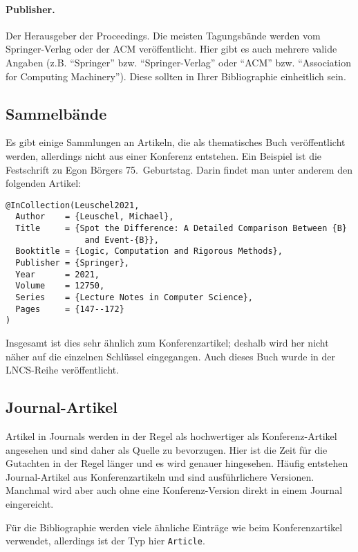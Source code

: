 \paragraph{Publisher.} Der Herausgeber der Proceedings.
Die meisten Tagungsbände werden vom Springer-Verlag oder der ACM veröffentlicht.
Hier gibt es auch mehrere valide Angaben (z.B. \enquote{Springer} bzw. \enquote{Springer-Verlag} oder \enquote{ACM} bzw. \enquote{Association for Computing Machinery}).
Diese sollten in Ihrer Bibliographie einheitlich sein.



\subsection{Sammelbände}

Es gibt einige Sammlungen an Artikeln, die als thematisches Buch veröffentlicht werden,
allerdings nicht aus einer Konferenz entstehen.
Ein Beispiel ist die Festschrift zu Egon Börgers 75.\ Geburtstag.
Darin findet man unter anderem den folgenden Artikel:

\begin{verbatim}
@InCollection(Leuschel2021,
  Author    = {Leuschel, Michael},
  Title     = {Spot the Difference: A Detailed Comparison Between {B}
                and Event-{B}},
  Booktitle = {Logic, Computation and Rigorous Methods},
  Publisher = {Springer},
  Year      = 2021,
  Volume    = 12750,
  Series    = {Lecture Notes in Computer Science},
  Pages     = {147--172}
)
\end{verbatim}

Insgesamt ist dies sehr ähnlich zum Konferenzartikel; deshalb wird her nicht näher auf die einzelnen Schlüssel eingegangen.
Auch dieses Buch wurde in der LNCS-Reihe veröffentlicht.

\subsection{Journal-Artikel}

Artikel in Journals werden in der Regel als hochwertiger als Konferenz-Artikel angesehen
und sind daher als Quelle zu bevorzugen.
Hier ist die Zeit für die Gutachten in der Regel länger und es wird genauer hingesehen.
Häufig entstehen Journal-Artikel aus Konferenzartikeln und sind ausführlichere Versionen.
Manchmal wird aber auch ohne eine Konferenz-Version direkt in einem Journal eingereicht.

Für die Bibliographie werden viele ähnliche Einträge wie beim Konferenzartikel verwendet,
allerdings ist der Typ hier \verb|Article|.

